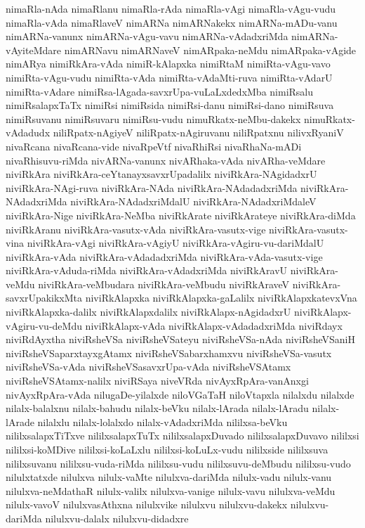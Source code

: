 {nimaRla-nAda
nimaRlanu
nimaRla-rAda
nimaRla-vAgi
nimaRla-vAgu-vudu
nimaRla-vAda
nimaRlaveV
nimARNa
nimARNakekx
nimARNa-mADu-vanu
nimARNa-vanunx
nimARNa-vAgu-vavu
nimARNa-vAdadxriMda
nimARNa-vAyiteMdare
nimARNavu
nimARNaveV
nimARpaka-neMdu
nimARpaka-vAgide
nimARya
nimiRkAra-vAda
nimiR-kAlapxka
nimiRtaM
nimiRta-vAgu-vavo
nimiRta-vAgu-vudu
nimiRta-vAda
nimiRta-vAdaMti-ruva
nimiRta-vAdarU
nimiRta-vAdare
nimiRsa-lAgada-savxrUpa-vuLaLxdedxMba
nimiRsalu
nimiRsalapxTaTx
nimiRsi
nimiRsida
nimiRsi-danu
nimiRsi-dano
nimiRsuva
nimiRsuvanu
nimiRsuvaru
nimiRsu-vudu
nimuRkatx-neMbu-dakekx
nimuRkatx-vAdadudx
niliRpatx-nAgiyeV
niliRpatx-nAgiruvanu
niliRpatxnu
nilivxRyaniV
nivaRcana
nivaRcana-vide
nivaRpeVtf
nivaRhiRsi
nivaRhaNa-mADi
nivaRhisuvu-riMda
nivARNa-vanunx
nivARhaka-vAda
nivARha-veMdare
niviRkAra
niviRkAra-ceYtanayxsavxrUpadalilx
niviRkAra-NAgidadxrU
niviRkAra-NAgi-ruva
niviRkAra-NAda
niviRkAra-NAdadadxriMda
niviRkAra-NAdadxriMda
niviRkAra-NAdadxriMdalU
niviRkAra-NAdadxriMdaleV
niviRkAra-Nige
niviRkAra-NeMba
niviRkArate
niviRkArateye
niviRkAra-diMda
niviRkAranu
niviRkAra-vasutx-vAda
niviRkAra-vasutx-vige
niviRkAra-vasutx-vina
niviRkAra-vAgi
niviRkAra-vAgiyU
niviRkAra-vAgiru-vu-dariMdalU
niviRkAra-vAda
niviRkAra-vAdadadxriMda
niviRkAra-vAda-vasutx-vige
niviRkAra-vAduda-riMda
niviRkAra-vAdadxriMda
niviRkAravU
niviRkAra-veMdu
niviRkAra-veMbudara
niviRkAra-veMbudu
niviRkAraveV
niviRkAra-savxrUpakikxMta
niviRkAlapxka
niviRkAlapxka-gaLalilx
niviRkAlapxkatevxVna
niviRkAlapxka-dalilx
niviRkAlapxdalilx
niviRkAlapx-nAgidadxrU
niviRkAlapx-vAgiru-vu-deMdu
niviRkAlapx-vAda
niviRkAlapx-vAdadadxriMda
niviRdayx
niviRdAyxtha
niviRsheVSa
niviRsheVSateyu
niviRsheVSa-nAda
niviRsheVSaniH
niviRsheVSaparxtayxgAtamx
niviRsheVSabarxhamxvu
niviRsheVSa-vasutx
niviRsheVSa-vAda
niviRsheVSasavxrUpa-vAda
niviRsheVSAtamx
niviRsheVSAtamx-nalilx
niviRSaya
niveVRda
nivAyxRpAra-vanAnxgi
nivAyxRpAra-vAda
nilugaDe-yilalxde
niloVGaTaH
niloVtapxla
nilalxdu
nilalxde
nilalx-balalxnu
nilalx-bahudu
nilalx-beVku
nilalx-lArada
nilalx-lAradu
nilalx-lArade
nilalxlu
nilalx-lolalxdo
nilalx-vAdadxriMda
nililxsa-beVku
nililxsalapxTiTxve
nililxsalapxTuTx
nililxsalapxDuvado
nililxsalapxDuvavo
nililxsi
nililxsi-koMDive
nililxsi-koLaLxlu
nililxsi-koLuLx-vudu
nililxside
nililxsuva
nililxsuvanu
nililxsu-vuda-riMda
nililxsu-vudu
nililxsuvu-deMbudu
nililxsu-vudo
nilulxtatxde
nilulxva
nilulx-vaMte
nilulxva-dariMda
nilulx-vadu
nilulx-vanu
nilulxva-neMdathaR
nilulx-valilx
nilulxva-vanige
nilulx-vavu
nilulxva-veMdu
nilulx-vavoV
nilulxvasAthxna
nilulxvike
nilulxvu
nilulxvu-dakekx
nilulxvu-dariMda
nilulxvu-dalalx
nilulxvu-didadxre
}

